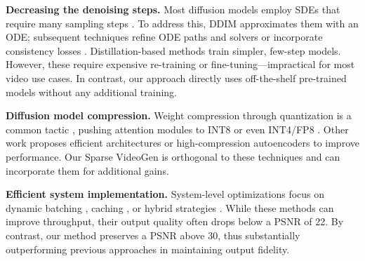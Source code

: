 \noindent\textbf{Decreasing the denoising steps.}
Most diffusion models employ SDEs that require many sampling steps \citep{song2019generative, ho2020denoising, meng2022sdedit}. To address this, DDIM \citep{song2020denoising} approximates them with an ODE; subsequent techniques refine ODE paths and solvers \citep{lu2022dpm, lu2022dpm++, liu2022flow, liu2023instaflow} or incorporate consistency losses \citep{song2023consistency, luo2023latent}. Distillation-based methods \citep{yin2024improved, yin2024one} train simpler, few-step models. However, these require expensive re-training or fine-tuning—impractical for most video use cases. In contrast, our approach directly uses off-the-shelf pre-trained models without any additional training.

\noindent\textbf{Diffusion model compression.}
Weight compression through quantization is a common tactic \citep{li2023q, zhao2024vidit, li2024svdquant}, pushing attention modules to INT8 \citep{zhang2025sageattention} or even INT4/FP8 \citep{zhang2024sageattention2}. Other work proposes efficient architectures \citep{xie2024sana,cai2024condition,chen2025pixart} or high-compression autoencoders \citep{chen2024deep} to improve performance. Our Sparse VideoGen is orthogonal to these techniques and can incorporate them for additional gains.

\noindent\textbf{Efficient system implementation.}
System-level optimizations focus on dynamic batching \citep{kodaira2023streamdiffusion, liang2024looking}, caching \citep{chen2024delta, zhao2024pab}, or hybrid strategies \citep{lv2024fastercache, liu2024timestep}. While these methods can improve throughput, their output quality often drops below a PSNR of 22. By contrast, our method preserves a PSNR above 30, thus substantially outperforming previous approaches in maintaining output fidelity.



